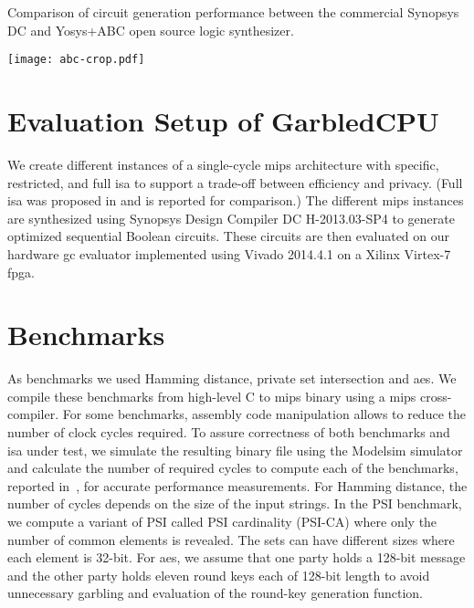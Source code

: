 \begin{table}[ht]
\caption{Comparison of circuit generation performance between the commercial Synopsys DC and Yosys+ABC open source logic synthesizer.}
\label{table:abc}
\centering
\texttt{[image: abc-crop.pdf]}
\end{table}

\section{Evaluation Setup of GarbledCPU}\label{ssect:evalset}
We create different instances of a single-cycle \gls{mips} architecture with specific, restricted, and full \acrshort{isa} to support a trade-off between efficiency and privacy. (Full \acrshort{isa} was proposed in \cite{songhori2015tinygarble} and is reported for comparison.) The different \gls{mips} instances are synthesized using Synopsys Design Compiler DC H-2013.03-SP4 to generate optimized sequential Boolean circuits. These circuits are then evaluated on our hardware \acrshort{gc} evaluator implemented using Vivado 2014.4.1 on a Xilinx Virtex-7 \acrshort{fpga}.

\section{Benchmarks}\label{ssect:bench}
As benchmarks we used Hamming distance, private set intersection and \acrshort{aes}. We compile these benchmarks from high-level C to \gls{mips} binary using a \gls{mips} cross-compiler. For some benchmarks, assembly code manipulation allows to reduce the number of clock cycles required. To assure correctness of both benchmarks and \acrshort{isa} under test, we simulate the resulting binary file using the Modelsim simulator and calculate the number of required cycles to compute each of the benchmarks, reported in~, for accurate performance measurements. For Hamming distance, the number of cycles depends on the size of the input strings. In the PSI benchmark, we compute a variant of PSI called PSI cardinality (PSI-CA) where only the number of common elements is revealed. The sets can have different sizes where each element is 32-bit.  For \acrshort{aes}, we assume that one party holds a 128-bit message and the other party holds eleven round keys each of 128-bit length to avoid unnecessary garbling and evaluation of the round-key generation function.


